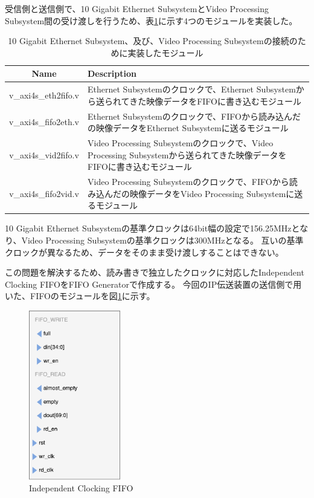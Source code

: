 受信側と送信側で、10 Gigabit Ethernet SubsystemとVideo Processing Subsystem間の受け渡しを行うため、表\ref{tb:fpga-implement-modules}に示す4つのモジュールを実装した。

\begin{table}[htbp]
  \caption{10 Gigabit Ethernet Subsystem、及び、Video Processing Subsystemの接続のために実装したモジュール}
  \label{tb:fpga-implement-modules}
  \begin{center}
  \begin{tabular}{c|p{12cm}}
    \hline
    Name               & Description \\\hline\hline
    v\_axi4s\_eth2fifo.v & Ethernet Subsystemのクロックで、Ethernet Subsystemから送られてきた映像データをFIFOに書き込むモジュール \\\hline
    v\_axi4s\_fifo2eth.v & Ethernet Subsystemのクロックで、FIFOから読み込んだの映像データをEthernet Subsystemに送るモジュール \\\hline
    v\_axi4s\_vid2fifo.v & Video Processing Subsystemのクロックで、Video Processing Subsystemから送られてきた映像データをFIFOに書き込むモジュール \\\hline
    v\_axi4s\_fifo2vid.v & Video Processing Subsystemのクロックで、FIFOから読み込んだの映像データをVideo Processing Subsystemに送るモジュール \\\hline
  \end{tabular}\end{center}
\end{table}

10 Gigabit Ethernet Subsystemの基準クロックは64bit幅の設定で156.25MHzとなり、Video Processing Subsystemの基準クロックは300MHzとなる。
互いの基準クロックが異なるため、データをそのまま受け渡しすることはできない。

この問題を解決するため、読み書きで独立したクロックに対応したIndependent Clocking FIFOをFIFO Generatorで作成する。
今回のIP伝送装置の送信側で用いた、FIFOのモジュールを図\ref{fig:fpga-independent-clocking-fifo}に示す。

\begin{figure}[htbp]
  \begin{center}
    \includegraphics[bb=0 0 201 371,width=4cm]{img/fpga-independent-clocking-fifo.pdf}
  \end{center}
  \caption{Independent Clocking FIFO}
  \label{fig:fpga-independent-clocking-fifo}
\end{figure}

